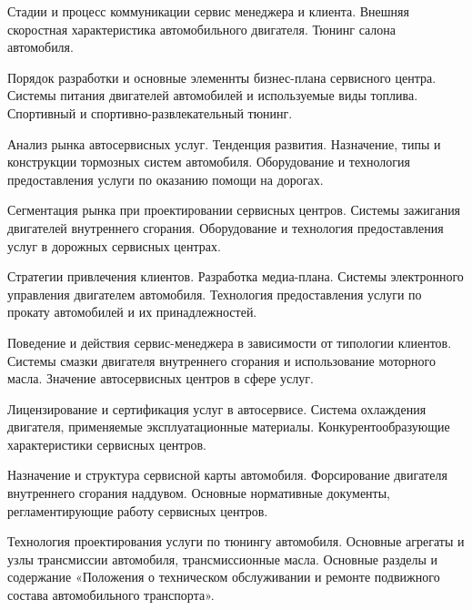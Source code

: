 \documentclass[
	11pt,
	a4paper,
	]
	{article}
\begin{document}
\bigskip

\noindent{} 
	{
		Стадии и процесс коммуникации сервис менеджера и клиента.
	}{
		Внешняя скоростная характеристика автомобильного двигателя.
	}{
		Тюнинг салона автомобиля.
	}

\bigskip

\noindent{} 
	{
		Порядок разработки и основные элеменнты бизнес-плана сервисного центра.
	}{
		Системы питания двигателей автомобилей и используемые виды топлива.
	}{
		Спортивный и спортивно-развлекательный тюнинг.
	}

\bigskip

\noindent{} 
	{
		Анализ рынка автосервисных услуг. Тенденция развития.
	}{
		Назначение, типы и конструкции тормозных систем автомобиля.
	}{
		Оборудование и технология предоставления услуги по оказанию помощи на дорогах.
	}

\bigskip

\noindent{} 
	{
		Сегментация рынка при проектировании сервисных центров.
	}{
		Системы зажигания двигателей внутреннего сгорания.
	}{
		Оборудование и технология предоставления услуг в дорожных сервисных центрах.
	}

\bigskip

\noindent{} 
	{
		Стратегии привлечения клиентов. Разработка медиа-плана.
	}{
		Системы электронного управления двигателем автомобиля.
	}{
		Технология предоставления услуги по прокату автомобилей и их принадлежностей.
	}

\bigskip

\noindent{} 
	{
		Поведение и действия сервис-менеджера в зависимости от типологии клиентов.
	}{
		Системы смазки двигателя внутреннего сгорания и использование моторного масла.
	}{
		Значение автосервисных центров в сфере услуг.
	}

\bigskip

\noindent{} 
	{
		Лицензирование и сертификация услуг в автосервисе.
	}{
		Система охлаждения двигателя, применяемые эксплуатационные материалы.
	}{
		Конкурентообразующие характеристики сервисных центров.
	}

\bigskip

\noindent{} 
	{
		Назначение и структура сервисной карты автомобиля.
	}{
		Форсирование двигателя внутреннего сгорания наддувом.
	}{
		Основные нормативные документы, регламентирующие работу сервисных центров.
	}

\bigskip

\noindent{} 
	{
		Технология проектирования услуги по тюнингу автомобиля.
	}{
		Основные агрегаты и узлы трансмиссии автомобиля, трансмиссионные масла.
	}{
		Основные разделы и содержание «Положения о техническом обслуживании и ремонте подвижного состава автомобильного транспорта».
	}
\end{document}
